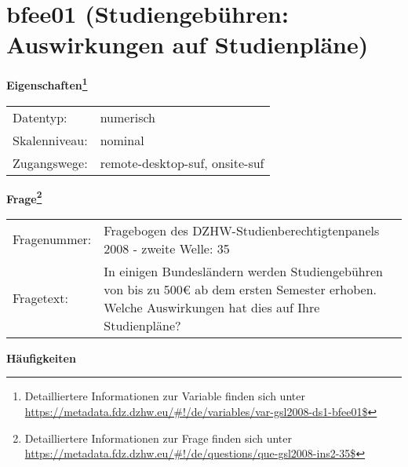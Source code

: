 
    \setcounter{footnote}{0}

    \vspace*{-1.8cm}
	\section{bfee01 (Studiengebühren: Auswirkungen auf Studienpläne)}
	\label{section:bfee01}



    \vspace*{0.5cm}
    \noindent\textbf{Eigenschaften\footnote{Detailliertere Informationen zur Variable finden sich unter
		\url{https://metadata.fdz.dzhw.eu/\#!/de/variables/var-gsl2008-ds1-bfee01$}}}\\
	\begin{tabularx}{\hsize}{@{}lX}
	Datentyp: & numerisch \\
	Skalenniveau: & nominal \\
	Zugangswege: &
	  remote-desktop-suf, 
	  onsite-suf
 \\
    \end{tabularx}



				\vspace*{0.5cm}
                \noindent\textbf{Frage\footnote{Detailliertere Informationen zur Frage finden sich unter
		              \url{https://metadata.fdz.dzhw.eu/\#!/de/questions/que-gsl2008-ins2-35$}}}\\
				\begin{tabularx}{\hsize}{@{}lX}
					Fragenummer: &
					  Fragebogen des DZHW-Studienberechtigtenpanels 2008 - zweite Welle:
					  35
 \\
					Fragetext: & In einigen Bundesländern werden Studiengebühren von bis zu 500€ ab dem ersten Semester erhoben. Welche Auswirkungen hat dies auf Ihre Studienpläne? \\
				\end{tabularx}





        		\vspace*{0.5cm}
                \noindent\textbf{Häufigkeiten}

